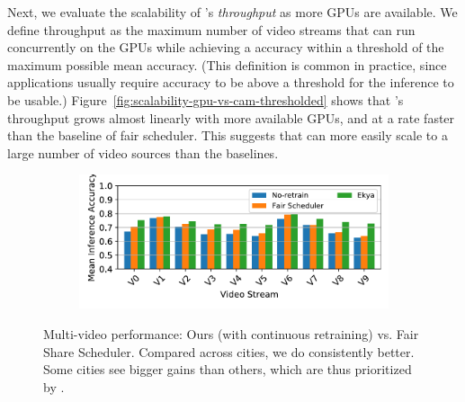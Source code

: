Next, we evaluate the scalability of \name's {\em throughput} as more GPUs are available.
We define throughput as the maximum number of video streams that can run concurrently on the GPUs while achieving a accuracy within a threshold of the maximum possible mean accuracy.
(This definition is common in practice, since applications usually require accuracy to be above a threshold for the inference to be usable.)
Figure~\ref{fig:scalability-gpu-vs-cam-thresholded} shows that \name's throughput grows almost linearly with more available GPUs, and at a rate \romilc{$2.3\times$} faster than the baseline of fair scheduler.
This suggests that \name can more easily scale to a large number of video sources than the baselines.

\begin{figure}
  \centering
    \begin{subfigure}[t]{\linewidth}
    \centering
    \includegraphics[width=0.9\linewidth]{results/multicam/cityscapes_across_cities.pdf} 
  \end{subfigure}
  \caption{Multi-video performance: Ours (with continuous retraining) vs. Fair Share Scheduler. Compared across cities, we do consistently better. Some cities see bigger gains than others, which are thus prioritized by \name{}.}
  \label{fig:multicam-cities}
\end{figure}


